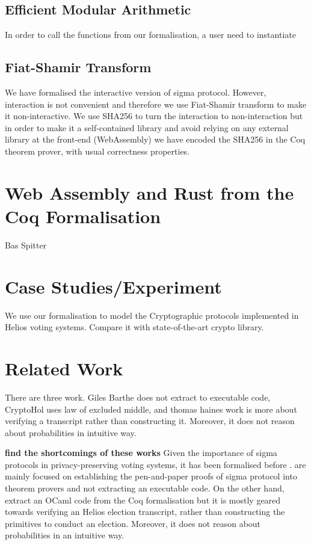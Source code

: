 \documentclass[conference,compsoc]{IEEEtran}
\begin{document}
  \subsection{Efficient Modular Arithmetic}
  In order to call the functions from our formalisation, 
  a user need to instantiate 

  \subsection{Fiat-Shamir Transform}
 We have formalised the interactive version of sigma protocol. However,
 interaction is not convenient and therefore
 we use Fiat-Shamir transform to make it non-interactive. We use SHA256 
 to turn the interaction to non-interaction but in order to 
 make it a self-contained library and 
 avoid relying on any external library at the front-end (WebAssembly)
 we have encoded the SHA256 in the Coq theorem prover, with usual correctness 
 properties. 

 

\section{Web Assembly and Rust from the Coq Formalisation}
  Bas Spitter


\section{Case Studies/Experiment}
  We use our formalisation to model the Cryptographic protocols implemented in 
  Helios voting systems. Compare it with state-of-the-art 
  crypto library. 


\section{Related Work}
  There are three work. Giles Barthe does not extract to executable code, 
  CryptoHol uses law of excluded middle, and thomas haines work is more about 
  verifying a transcript rather than constructing it. Moreover, 
  it does not reason about probabilities in intuitive way. 

\textbf{find the shortcomings of these works}
Given the importance of sigma protocols in privacy-preserving voting systems,
it has been formalised before  \cite{5552642,butler2019formalisation,10.1145/3319535.3354247}. 
\cite{5552642,butler2019formalisation} are mainly focused on establishing the 
pen-and-paper proofs of sigma protocol into theorem provers and not extracting an executable code.
On the other hand, \cite{10.1145/3319535.3354247} extract an OCaml code from the Coq 
formalisation but it is mostly geared towards verifying an Helios election transcript, 
rather than constructing the primitives to conduct an election. Moreover, 
it does not reason about probabilities in an intuitive way.
\end{document}
